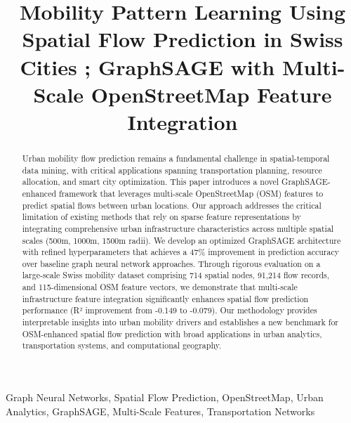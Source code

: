 \documentclass[twocolumn,11pt]{IEEEtran}  %
\begin{document}
\title{Mobility Pattern Learning Using Spatial Flow Prediction in Swiss Cities ; GraphSAGE with Multi-Scale OpenStreetMap Feature Integration}


\author{
\and
{}
}

\maketitle

\begin{abstract}
Urban mobility flow prediction remains a fundamental challenge in spatial-temporal data mining, with critical applications spanning transportation planning, resource allocation, and smart city optimization. This paper introduces a novel GraphSAGE-enhanced framework that leverages multi-scale OpenStreetMap (OSM) features to predict spatial flows between urban locations. Our approach addresses the critical limitation of existing methods that rely on sparse feature representations by integrating comprehensive urban infrastructure characteristics across multiple spatial scales (500m, 1000m, 1500m radii). We develop an optimized GraphSAGE architecture with refined hyperparameters that achieves a 47\% improvement in prediction accuracy over baseline graph neural network approaches. Through rigorous evaluation on a large-scale Swiss mobility dataset comprising 714 spatial nodes, 91,214 flow records, and 115-dimensional OSM feature vectors, we demonstrate that multi-scale infrastructure feature integration significantly enhances spatial flow prediction performance (R² improvement from -0.149 to -0.079). Our methodology provides interpretable insights into urban mobility drivers and establishes a new benchmark for OSM-enhanced spatial flow prediction with broad applications in urban analytics, transportation systems, and computational geography.
\end{abstract}

\begin{IEEEkeywords}
Graph Neural Networks, Spatial Flow Prediction, OpenStreetMap, Urban Analytics, GraphSAGE, Multi-Scale Features, Transportation Networks
\end{IEEEkeywords}
\end{document}
